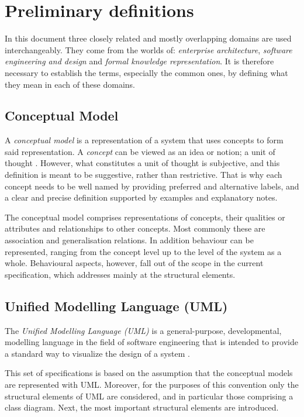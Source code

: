 \section{Preliminary definitions}
	\label{sec:definitions}

	In this document three closely related and mostly overlapping domains are used interchangeably. They come from the worlds of: \textit{enterprise architecture}, \textit{software engineering and design} and \textit{formal knowledge representation}. It is therefore necessary to establish the terms, especially the common ones, by defining what they mean in each of these domains. 

	\subsection{Conceptual Model}
	\label{sec:cm}
	
	A \textit{conceptual model} is a representation of a system that uses concepts to form said representation. A \textit{concept} can be viewed as an idea or notion; a unit of thought \cite{skos-spec}. However, what constitutes a unit of thought is subjective, and this definition is meant to be suggestive, rather than restrictive. That is why each concept needs to be well named by providing preferred and alternative labels, and a clear and precise definition supported by examples and explanatory notes.
	
	The conceptual model comprises representations of concepts, their qualities or attributes and relationships to other concepts. Most commonly these are association and generalisation relations. In addition behaviour can be represented, ranging from the concept level up to the level of the system as a whole. Behavioural aspects, however, fall out of the scope in the current specification, which addresses mainly at the structural elements.

	\subsection{Unified Modelling Language (UML)}
	\label{sec:uml}
	
	The \textit{Unified Modelling Language (UML)} is a general-purpose, developmental, modelling language in the field of software engineering that is intended to provide a standard way to visualize the design of a system \cite{uml-userguide}.
	
	This set of specifications is based on the assumption that the conceptual models are represented with UML. Moreover, for the purposes of this convention only the structural elements of UML are considered, and in particular those comprising a class diagram. Next, the most important structural elements are introduced.
	
